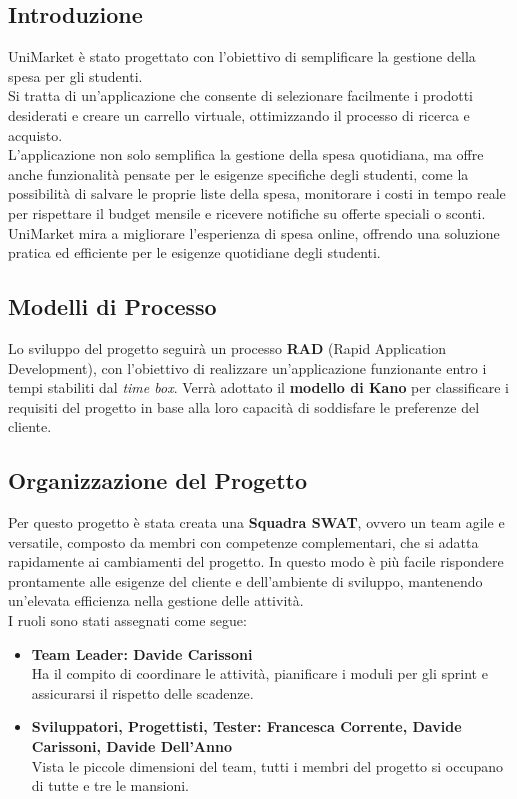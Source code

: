 \documentclass[a4paper,12pt]{article}
\begin{document}
\subsection{Introduzione} %
UniMarket è stato progettato con l'obiettivo di semplificare la gestione della spesa per gli studenti.\\  
Si tratta di un'applicazione che consente di selezionare facilmente i prodotti desiderati e creare un carrello virtuale, ottimizzando il processo di ricerca e acquisto. \\
L'applicazione non solo semplifica la gestione della spesa quotidiana, ma offre anche funzionalità pensate per le esigenze specifiche degli studenti, come la possibilità di salvare le proprie liste della spesa, monitorare i costi in tempo reale per rispettare il budget mensile e ricevere notifiche su offerte speciali o sconti. \\
UniMarket mira a migliorare l'esperienza di spesa online, offrendo una soluzione pratica ed efficiente per le esigenze quotidiane degli studenti.

\subsection{Modelli di Processo} %
Lo sviluppo del progetto seguirà un processo \textbf{RAD} (Rapid Application Development), con l’obiettivo di realizzare un’applicazione funzionante entro i tempi stabiliti dal \textit{time box}.  
Verrà adottato il \textbf{modello di Kano} per classificare i requisiti del progetto in base alla loro capacità di soddisfare le preferenze del cliente.


\subsection{Organizzazione del Progetto} %
Per questo progetto è stata creata una \textbf{Squadra SWAT}, ovvero un team agile e versatile, composto da membri con competenze complementari, che si adatta 
rapidamente ai cambiamenti del progetto. In questo modo è più facile rispondere prontamente alle esigenze del cliente e dell’ambiente di sviluppo, 
mantenendo un'elevata efficienza nella gestione delle attività. \\
I ruoli sono stati assegnati come segue: 
\begin{itemize}
    \item \textbf{Team Leader: Davide Carissoni} \\
    Ha il compito di coordinare le attività, pianificare i moduli per gli sprint e assicurarsi il rispetto delle scadenze. 
    \item \textbf{Sviluppatori, Progettisti, Tester: Francesca Corrente, Davide Carissoni, Davide Dell'Anno} \\
    Vista le piccole dimensioni del team, tutti i membri del progetto si occupano di tutte e tre le mansioni.
\end{itemize}
\end{document}
